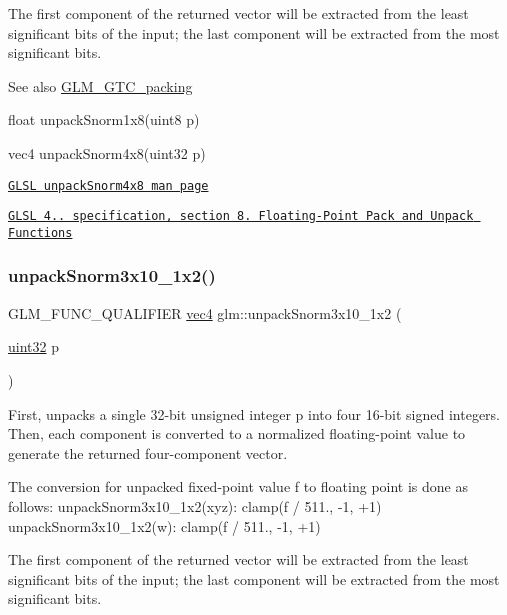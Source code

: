 The first component of the returned vector will be extracted from the least significant bits of the input; the last component will be extracted from the most significant bits.

\begin{DoxySeeAlso}{See also}
\hyperlink{group__gtc__packing}{G\+L\+M\+\_\+\+G\+T\+C\+\_\+packing} 

float unpack\+Snorm1x8(uint8 p) 

vec4 unpack\+Snorm4x8(uint32 p) 

\href{http://www.opengl.org/sdk/docs/manglsl/xhtml/unpackSnorm4x8.xml}{\tt G\+L\+SL unpack\+Snorm4x8 man page} 

\href{http://www.opengl.org/registry/doc/GLSLangSpec.4.20.8.pdf}{\tt G\+L\+SL 4.. specification, section 8. Floating-\/\+Point Pack and Unpack Functions} 
\end{DoxySeeAlso}
\mbox{\label{group__gtc__packing_ga8b8bb827a3743ca553d8702d3e337101}} 
\subsubsection{\texorpdfstring{unpack\+Snorm3x10\+\_\+1x2()}{unpackSnorm3x10\_1x2()}}
{\footnotesize\ttfamily G\+L\+M\+\_\+\+F\+U\+N\+C\+\_\+\+Q\+U\+A\+L\+I\+F\+I\+ER \hyperlink{group__core__types_ga5881b1b022d7fd1b7218f5916532dd02}{vec4} glm\+::unpack\+Snorm3x10\+\_\+1x2 (\begin{DoxyParamCaption}\item[{\hyperlink{group__gtc__type__precision_ga202b6a53c105fcb7e531f9b443518451}{uint32}}]{p }\end{DoxyParamCaption})}

First, unpacks a single 32-\/bit unsigned integer p into four 16-\/bit signed integers. Then, each component is converted to a normalized floating-\/point value to generate the returned four-\/component vector.

The conversion for unpacked fixed-\/point value f to floating point is done as follows\+: unpack\+Snorm3x10\+\_\+1x2(xyz)\+: clamp(f / 511., -\/1, +1) unpack\+Snorm3x10\+\_\+1x2(w)\+: clamp(f / 511., -\/1, +1)

The first component of the returned vector will be extracted from the least significant bits of the input; the last component will be extracted from the most significant bits.

